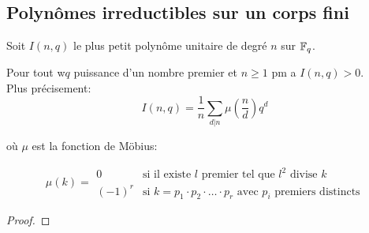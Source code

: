 \subsection{Polynômes irreductibles sur un corps fini}


Soit $I(n,q)$ le plus petit polynôme unitaire de degré $n$ sur $\mathbb{F}_q$.

\begin{theorem}
	Pour tout w$q$ puissance d'un nombre premier et $n \geq 1$ pm a $I(n,q) > 0$.\\

	Plus précisement:
	$$ I(n,q) = \frac{1}{n} \sum_{d|n} \mu(\frac{n}{d}) q^d$$

	où $\mu$ est la fonction de Möbius:

	\[ \mu(k) = \begin{array}{ll}
			0      & \text{si il existe } l \text{ premier tel que } l^2 \text{ divise } k                            \\
			(-1)^r & \text{si } k = p_1 \cdot p_2 \cdot \ldots \cdot p_r \text{ avec } p_i \text{ premiers distincts}
		\end{array} \]

\end{theorem}

\begin{proof}
\end{proof}

